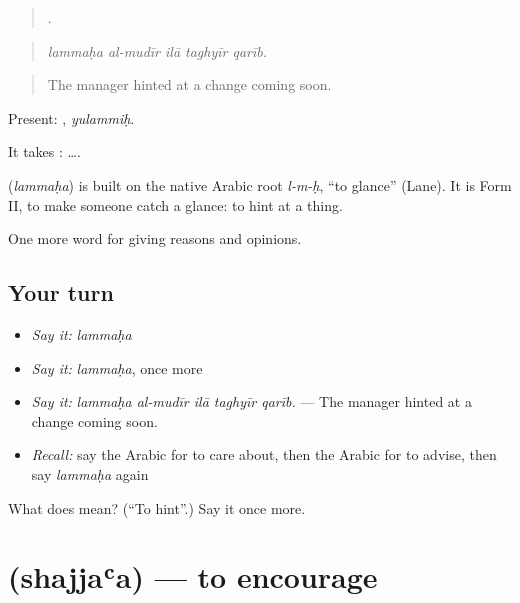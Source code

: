 \begin{quote}
    .
\end{quote}

\begin{quote}
\emph{lammaḥa al-mudīr ilā taghyīr qarīb.}
\end{quote}

\begin{quote}
The manager hinted at a change coming soon.
\end{quote}

Present: , \emph{yulammiḥ}.

It takes :   ….

\begin{cousinweb}
\textbf{} (\emph{lammaḥa}) is built on the native Arabic root \emph{l-m-ḥ}, \textquotedblleft{}to glance\textquotedblright{} (Lane). It is Form II, to make someone catch a glance: to hint at a thing.
\end{cousinweb}

\begin{grammarlens}[title={What you've built}]
One more word for giving reasons and opinions.
\end{grammarlens}

\subsection*{Your turn}
\begin{itemize}
\raggedright
  \item \emph{Say it:} \emph{lammaḥa}
  \item \emph{Say it:} \emph{lammaḥa}, once more
  \item \emph{Say it:} \emph{lammaḥa al-mudīr ilā taghyīr qarīb.} — The manager hinted at a change coming soon.
  \item \emph{Recall:} say the Arabic for to care about, then the Arabic for to advise, then say \emph{lammaḥa} again
\end{itemize}

\begin{tcolorbox}[breakable,colback=teal!4,colframe=teal!35!black,title={Before you move on}]
What does  mean? (\textquotedblleft{}To hint\textquotedblright{}.) Say it once more.
\end{tcolorbox}
\section[\texorpdfstring{\ar{شجع} (shajjaʿa)}{شجع (shajjaʿa)}]{ (shajjaʿa) — to encourage}


